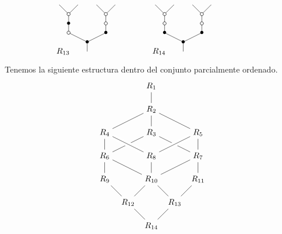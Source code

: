 \documentclass[../main.tex]{subfiles}
\begin{document}
\begin{ex}
    $$
        \xy
        <0.08cm, 0cm>:
        (0.0, 0.0)*{}="1"; %
        (0.0, 5.0)*=0{\bullet}="2"; %
        (-10.0, 10.0)*\cir<2pt>{}="3"; %
        (-10.0, 15.0)*=0{\bullet}="4"; %
        (-10.0, 20.0)*\cir<2pt>{}="5"; %
        (-15.0, 25.0)*{}="6"; %
        (-5.0, 25.0)*{}="7"; %
        (10.0, 10.0)*=0{\bullet}="8"; %
        (10.0, 15.0)*\cir<2pt>{}="9"; %
        (10.0, 20.0)*\cir<2pt>{}="10"; %
        (5.0, 25.0)*{}="11"; %
        (15.0, 25.0)*{}="12"; %
        "1";"2" **\dir{-};
        "2";"3" **\dir{-};
        "3";"4" **\dir{-};
        "4";"5" **\dir{-};
        "5";"6" **\dir{-};
        "5";"7" **\dir{-};
        "2";"8" **\dir{-};
        "8";"9" **\dir{-};
        "9";"10" **\dir{-};
        "10";"11" **\dir{-};
        "10";"12" **\dir{-};
        (-13,0)*{R_{13}};
        \endxy
        \xy
        <0.08cm, 0cm>:
        (-10, 0.0)*{}="1";
        (10, 10.0)*{}="2";
        \endxy
        \xy
        <0.08cm, 0cm>:
        (0.0, 0.0)*{}="1"; %
        (0.0, 5.0)*=0{\bullet}="2"; %
        (-10.0, 10.0)*=0{\bullet}="3"; %
        (-10.0, 15.0)*\cir<2pt>{}="4"; %
        (-10.0, 20.0)*\cir<2pt>{}="5"; %
        (-15.0, 25.0)*{}="6"; %
        (-5.0, 25.0)*{}="7"; %
        (10.0, 10.0)*=0{\bullet}="8"; %
        (10.0, 15.0)*\cir<2pt>{}="9"; %
        (10.0, 20.0)*\cir<2pt>{}="10"; %
        (5.0, 25.0)*{}="11"; %
        (15.0, 25.0)*{}="12"; %
        "1";"2" **\dir{-};
        "2";"3" **\dir{-};
        "3";"4" **\dir{-};
        "4";"5" **\dir{-};
        "5";"6" **\dir{-};
        "5";"7" **\dir{-};
        "2";"8" **\dir{-};
        "8";"9" **\dir{-};
        "9";"10" **\dir{-};
        "10";"11" **\dir{-};
        "10";"12" **\dir{-};
        (-13,0)*{R_{14}};
        \endxy
        \xy
        <0.08cm, 0cm>:
        (-10, 0.0)*{}="1";
        (10, 10.0)*{}="2";
        \endxy
    $$

    Tenemos la siguiente estructura dentro del conjunto parcialmente ordenado.
    $$
        \begin{tikzpicture}
            \node (max) at (0,0) {$R_{14}$};
            \node (12) at (-1,1) {$R_{12}$};
            \node (13) at (1,1) {$R_{13}$};
            \node (9) at (-2,2) {$R_{9}$};
            \node (10) at (0,2) {$R_{10}$};
            \node (11) at (2,2) {$R_{11}$};
            \node (6) at (-2,3) {$R_{6}$};
            \node (8) at (0,3) {$R_{8}$};
            \node (7) at (2,3) {$R_{7}$};
            \node (4) at (-2,4) {$R_{4}$};
            \node (3) at (0,4) {$R_{3}$};
            \node (5) at (2,4) {$R_{5}$};
            \node (2) at (0,5) {$R_{2}$};
            \node (min) at (0,6) {$R_{1}$};
            \draw (min) -- (2) -- (4) -- (6) -- (9) -- (12) -- (max)
            (2) -- (5) -- (7) -- (11) -- (13) -- (max)
            (2) -- (3) -- (6) -- (10) -- (12)
            (3) -- (7) -- (10) -- (13)
            (8) -- (10);
            \draw[preaction={draw=white, -,line width=6pt}] (4) -- (8) -- (5);
        \end{tikzpicture}
    $$
\end{ex}
\end{document}
